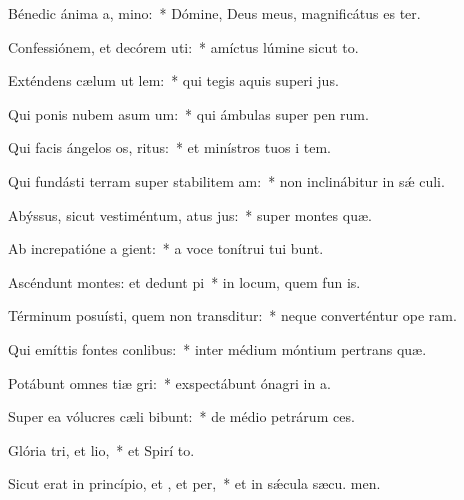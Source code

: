 \item Bénedic ánima a, mino:~* Dómine, Deus meus, magnificátus es ter.
\item Confessiónem, et decórem uti:~* amíctus lúmine sicut to.
\item Exténdens cælum ut lem:~* qui tegis aquis superi jus.
\item Qui ponis nubem asum um:~* qui ámbulas super pen rum.
\item Qui facis ángelos os, ritus:~* et minístros tuos i tem.
\item Qui fundásti terram super stabilitem am:~* non inclinábitur in sǽ culi.
\item Abýssus, sicut vestiméntum, atus jus:~* super montes  quæ.
\item Ab increpatióne a gient:~* a voce tonítrui tui bunt.
\item Ascéndunt montes: et dedunt pi~* in locum, quem fun is.
\item Términum posuísti, quem non transditur:~* neque converténtur ope ram.
\item Qui emíttis fontes  conlibus:~* inter médium móntium pertrans quæ.
\item Potábunt omnes tiæ gri:~* exspectábunt ónagri in  a.
\item Super ea vólucres cæli bibunt:~* de médio petrárum  ces.
\item Glória tri, et lio,~* et Spirí to.
\item Sicut erat in princípio, et , et per,~* et in sǽcula sæcu. men.
